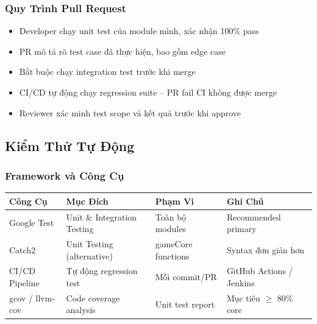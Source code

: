 \documentclass[12pt,a4paper]{article}
\begin{document}
\subsubsection{Quy Trình Pull Request}
\begin{itemize}[leftmargin=3em]
  \item Developer chạy unit test của module mình, xác nhận 100\% pass
  \item PR mô tả rõ test case đã thực hiện, bao gồm edge case
  \item Bắt buộc chạy integration test trước khi merge
  \item CI/CD tự động chạy regression suite – PR fail CI không được merge
  \item Reviewer xác minh test scope và kết quả trước khi approve
\end{itemize}

\subsection{Kiểm Thử Tự Động}

\subsubsection{Framework và Công Cụ}

\begin{table}[H]
\centering
{}
\begin{tabularx}{\linewidth}{|l|X|l|X|}
\hline
\rowcolor{gray!35}
\textbf{Công Cụ} & \textbf{Mục Đích} & \textbf{Phạm Vi} & \textbf{Ghi Chú} \\ \hline
Google Test      & Unit \& Integration Testing  & Toàn bộ modules     & Recommended primary \\ \hline
Catch2           & Unit Testing (alternative)   & gameCore functions  & Syntax đơn giản hơn \\ \hline
CI/CD Pipeline   & Tự động regression test      & Mỗi commit/PR       & GitHub Actions / Jenkins \\ \hline
gcov / llvm-cov  & Code coverage analysis       & Unit test report    & Mục tiêu $\geq$ 80\% core \\ \hline
\end{tabularx}
\end{table}
\end{document}
